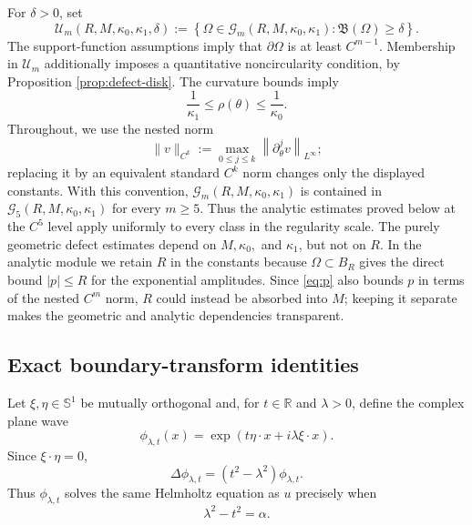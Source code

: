 \documentclass[12pt]{article}
\newcommand{\R}{\mathbb{R}}
\numberwithin{equation}{section}
\numberwithin{equation}{section}
\newcommand{\Sph}{\mathbb{S}^1}
\newcommand{\cG}{\mathcal{G}}
\newcommand{\cU}{\mathcal{U}}
\begin{document}
For $\delta>0$, set
\[
 \cU_m\left(R,M,\kappa_0,\kappa_1,\delta\right)
 :=\left\{\Omega\in\cG_m\left(R,M,\kappa_0,\kappa_1\right):
 \mathfrak B(\Omega)\geq\delta\right\}.
\]
The support-function assumptions imply that $\partial\Omega$ is at least
$C^{m-1}$. Membership in $\cU_m$ additionally imposes a quantitative
noncircularity condition, by Proposition \ref{prop:defect-disk}.  The
curvature bounds imply
\begin{equation}\label{eq:rho-bounds}
\frac1{\kappa_1}\le\rho(\theta)\le\frac1{\kappa_0}.
\end{equation}
Throughout, we use the nested norm
\[
 \|v\|_{C^k}:=\max_{0\le j\le k}\left\|\partial_\theta^jv\right\|_{L^\infty};
\]
replacing it by an equivalent standard $C^k$ norm changes only the displayed
constants.  With this convention, $\cG_m\left(R,M,\kappa_0,\kappa_1\right)$ is
contained in $\cG_5\left(R,M,\kappa_0,\kappa_1\right)$ for every $m\geq5$. Thus the
analytic estimates proved below at the $C^5$ level apply uniformly to every
class in the regularity scale. The purely geometric defect estimates depend
on $M,\kappa_0,$ and $\kappa_1$, but not on $R$. In the analytic module we
retain $R$ in the constants because $\Omega\subset B_R$ gives the direct bound
$|p|\le R$ for the exponential amplitudes. Since \eqref{eq:p} also bounds
$p$ in terms of the nested $C^m$ norm, $R$ could instead be absorbed into
$M$; keeping it separate makes the geometric and analytic dependencies
transparent.


\subsection{Exact boundary-transform identities}

Let $\xi,\eta\in\Sph$ be mutually orthogonal and, for $t\in\R$ and
$\lambda>0$, define the complex plane wave
\begin{equation*}\label{eq:plane-wave}
\phi_{\lambda,t}(x)
=\exp\left(t\eta\cdot x+i\lambda\xi\cdot x\right).
\end{equation*}
Since $\xi\cdot\eta=0$,
\[
\Delta\phi_{\lambda,t}
=\left(t^2-\lambda^2\right)\phi_{\lambda,t}.
\]
Thus $\phi_{\lambda,t}$ solves the same Helmholtz equation as $u$ precisely
when
\begin{equation}\label{eq:dispersion}
\lambda^2-t^2=\alpha.
\end{equation}
\end{document}
